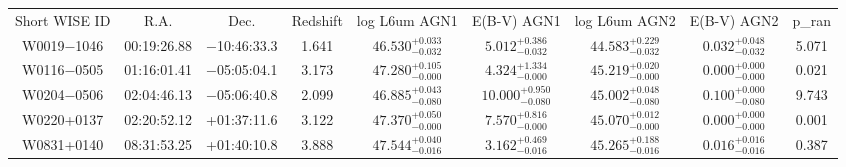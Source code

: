 \begin{table}
\begin{tabular}{ccccccccc}
Short WISE ID & R.A. & Dec. & Redshift & log L6um AGN1 & E(B-V) AGN1 & log L6um AGN2 & E(B-V) AGN2 & p_ran \\
W0019$-$1046 & 00:19:26.88 & $-$10:46:33.3 & 1.641 & $46.530^{+0.033}_{-0.032}$ & $5.012^{+0.386}_{-0.032}$ & $44.583^{+0.229}_{-0.032}$ & $0.032^{+0.048}_{-0.032}$ & 5.071 \\
W0116$-$0505 & 01:16:01.41 & $-$05:05:04.1 & 3.173 & $47.280^{+0.105}_{-0.000}$ & $4.324^{+1.334}_{-0.000}$ & $45.219^{+0.020}_{-0.000}$ & $0.000^{+0.000}_{-0.000}$ & 0.021 \\
W0204$-$0506 & 02:04:46.13 & $-$05:06:40.8 & 2.099 & $46.885^{+0.043}_{-0.080}$ & $10.000^{+0.950}_{-0.080}$ & $45.002^{+0.048}_{-0.080}$ & $0.100^{+0.000}_{-0.080}$ & 9.743 \\
W0220+0137 & 02:20:52.12 & +01:37:11.6 & 3.122 & $47.370^{+0.050}_{-0.000}$ & $7.570^{+0.816}_{-0.000}$ & $45.070^{+0.012}_{-0.000}$ & $0.000^{+0.000}_{-0.000}$ & 0.001 \\
W0831+0140 & 08:31:53.25 & +01:40:10.8 & 3.888 & $47.544^{+0.040}_{-0.016}$ & $3.162^{+0.469}_{-0.016}$ & $45.265^{+0.188}_{-0.016}$ & $0.016^{+0.016}_{-0.016}$ & 0.387 \\
\end{tabular}
\end{table}
